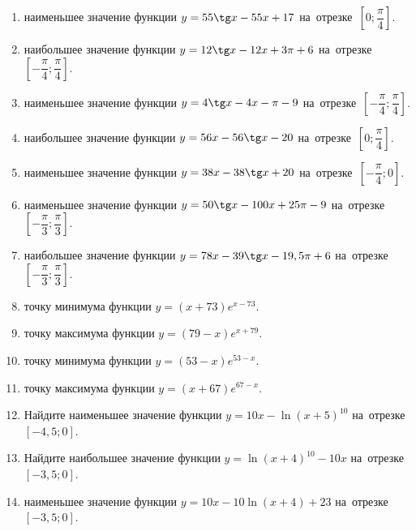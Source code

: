 \documentclass[a4paper,10pt]{article}
\begin{document}
\begin{enumerate}
\item {} наименьшее значение функции $y = 55\tg x-55x+17$ на~отрезке~$\left[0;\dfrac{\pi }{4}\right]$.

\item {} наибольшее значение функции $y=12\tg x-12x+3\pi +6$ на~отрезке~$\left[-\dfrac{\pi }{4};\dfrac{\pi }{4}\right]$.

\item {} наименьшее значение функции $y=4\tg x-4x-\pi -9$ на~отрезке~$\left[-\dfrac{\pi }{4};\dfrac{\pi }{4}\right]$.

\item {} наибольшее значение функции $y = 56x-56\tg x -20$ на~отрезке~$\left[0;\dfrac{\pi }{4}\right]$.

\item {} наименьшее значение функции $y = 38x-38\tg x +20$ на~отрезке~$\left[-\dfrac{\pi }{4};0\right]$.

\item {} наименьшее значение функции $y = 50\tg x-100x+25 \pi -9$ на~отрезке~$\left[-\dfrac{\pi }{3};\dfrac{\pi }{3}\right]$.

\item {} наибольшее значение функции $y = 78x-39\tg x-19,5\pi +6$ на~отрезке~$\left[-\dfrac{\pi }{3};\dfrac{\pi }{3}\right]$.

\item {} точку минимума функции $y = \left(x+73\right)e^{x-73}$.

\item {} точку максимума функции $y = \left(79-x\right)e^{x+79}$.

\item {} точку минимума функции $y = \left(53-x\right)e^{53-x}$.

\item {} точку максимума функции $y = \left(x+67\right)e^{67-x}$.

\item Найдите наименьшее значение функции $y = 10x-\ln \left(x+5\right)^{10}$ на~отрезке~$\left[-4,5;0\right]$.

\item Найдите наибольшее значение функции $y = \ln \left(x+4\right)^{10}-10x$ на~отрезке~$\left[-3,5;0\right]$.

\item {} наименьшее значение функции $y = 10x-10\ln \left(x+4\right) +23$ на~отрезке~$\left[-3,5;0\right]$.


\end{enumerate}
\end{document}
